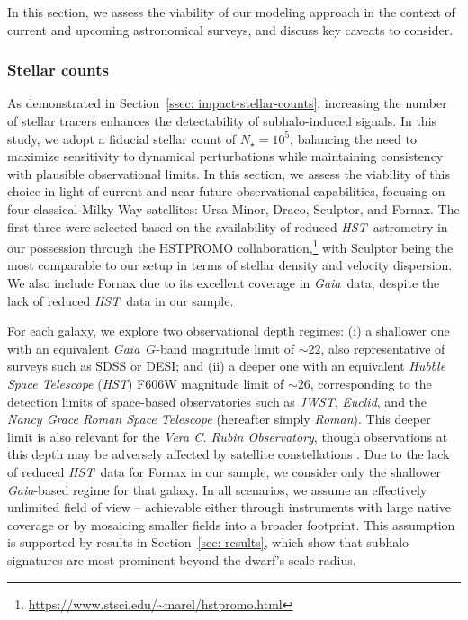 \documentclass[fleqn,usenatbib]{mnras}
\newcommand{\JP}[1]{{\color{darkorange}#1}}
\newcommand{\ev}[1]{\textcolor{darkgreen}{\bf Eduardo: #1}}
\newcommand{\gaia}{{\sl Gaia}}
\newcommand{\hst}{{\sl HST}}
\newcommand{\jwst}{{\sl JWST}}
\begin{document}
In this section, we assess the viability of our modeling approach in the context of current and upcoming astronomical surveys, and discuss key caveats to consider.

\subsubsection{Stellar counts} 
\label{ssec: expectations-stellar-counts}

As demonstrated in Section~\ref{ssec: impact-stellar-counts}, increasing the number of stellar tracers enhances the detectability of subhalo-induced signals. In this study, we adopt a fiducial stellar count of $N_{\star} = 10^{5}$, balancing the need to maximize sensitivity to dynamical perturbations while maintaining consistency with plausible observational limits.
In this section, we assess the viability of this choice in light of current and near-future observational capabilities, focusing on four classical Milky Way satellites: Ursa Minor, Draco, Sculptor, and Fornax. The first three were selected based on the availability of reduced \hst\ astrometry in our possession through the HSTPROMO collaboration,\footnote{\url{https://www.stsci.edu/~marel/hstpromo.html}} with Sculptor being the most comparable to our setup in terms of stellar density and velocity dispersion. We also include Fornax due to its excellent coverage in \gaia\ data, despite the lack of reduced \hst\ data in our sample.


For each galaxy, we explore two observational depth regimes: (i) a shallower one with an equivalent \gaia\ $G$-band magnitude limit of $\sim 22$, also representative of surveys such as SDSS or DESI; and (ii) a deeper one with an equivalent \textit{Hubble Space Telescope} (\hst) F606W magnitude limit of $\sim 26$, corresponding to the detection limits of space-based observatories such as \jwst, \textit{Euclid}, and the \textit{Nancy Grace Roman Space Telescope} (hereafter simply {\it Roman}). This deeper limit is also relevant for the \textit{Vera C. Rubin Observatory}, though observations at this depth may be adversely affected by satellite constellations \citep{Hainaut&Williams20}. 
Due to the lack of reduced \hst\ data for Fornax in our sample, we consider only the shallower \gaia-based regime for that galaxy.
In all scenarios, we assume an effectively unlimited field of view -- achievable either through instruments with large native coverage or by mosaicing smaller fields into a broader footprint. This assumption is supported by results in Section~\ref{sec: results}, which show that subhalo signatures are most prominent beyond the dwarf’s scale radius.
\end{document}
